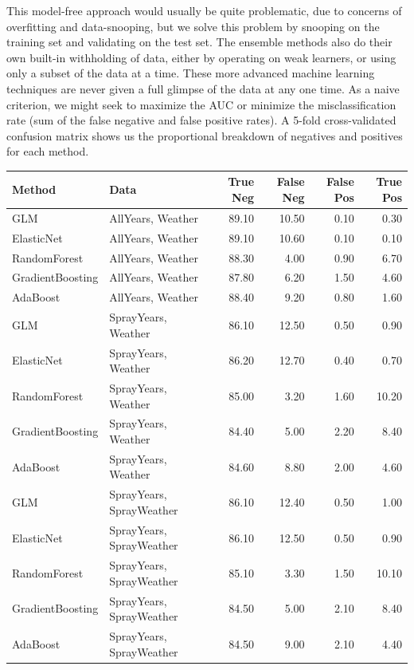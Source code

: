 \documentclass[12pt]{article}
\begin{document}
This model-free approach would usually be quite problematic, due to concerns of overfitting and data-snooping, but we solve this problem by snooping on the training set and validating on the test set. The ensemble methods also do their own built-in withholding of data, either by operating on weak learners, or using only a subset of the data at a time. These more advanced machine learning techniques are never given a full glimpse of the data at any one time. As a naive criterion, we might seek to maximize the AUC or minimize the misclassification rate (sum of the false negative and false positive rates). A 5-fold cross-validated confusion matrix shows us the proportional breakdown of negatives and positives for each method.

\begin{table}[H] \center \footnotesize
\begin{tabular}{|ll|rrrr|} \hline
Method & Data & True Neg & False Neg & False Pos & True Pos \\ \hline
GLM & AllYears, Weather & 89.10 & 10.50 & 0.10 & 0.30 \\ 
  ElasticNet & AllYears, Weather & 89.10 & 10.60 & 0.10 & 0.10 \\ 
  RandomForest & AllYears, Weather & 88.30 & 4.00 & 0.90 & 6.70 \\ 
  GradientBoosting & AllYears, Weather & 87.80 & 6.20 & 1.50 & 4.60 \\ 
  AdaBoost & AllYears, Weather & 88.40 & 9.20 & 0.80 & 1.60 \\ \hline
  GLM & SprayYears, Weather & 86.10 & 12.50 & 0.50 & 0.90 \\ 
  ElasticNet & SprayYears, Weather & 86.20 & 12.70 & 0.40 & 0.70 \\ 
  RandomForest & SprayYears, Weather & 85.00 & 3.20 & 1.60 & 10.20 \\ 
  GradientBoosting & SprayYears, Weather & 84.40 & 5.00 & 2.20 & 8.40 \\ 
  AdaBoost & SprayYears, Weather & 84.60 & 8.80 & 2.00 & 4.60 \\ \hline
  GLM & SprayYears, SprayWeather & 86.10 & 12.40 & 0.50 & 1.00 \\ 
  ElasticNet & SprayYears, SprayWeather & 86.10 & 12.50 & 0.50 & 0.90 \\ 
  RandomForest & SprayYears, SprayWeather & 85.10 & 3.30 & 1.50 & 10.10 \\ 
  GradientBoosting & SprayYears, SprayWeather & 84.50 & 5.00 & 2.10 & 8.40 \\ 
  AdaBoost & SprayYears, SprayWeather & 84.50 & 9.00 & 2.10 & 4.40 \\ \hline
\end{tabular}
\end{table}
\end{document}
